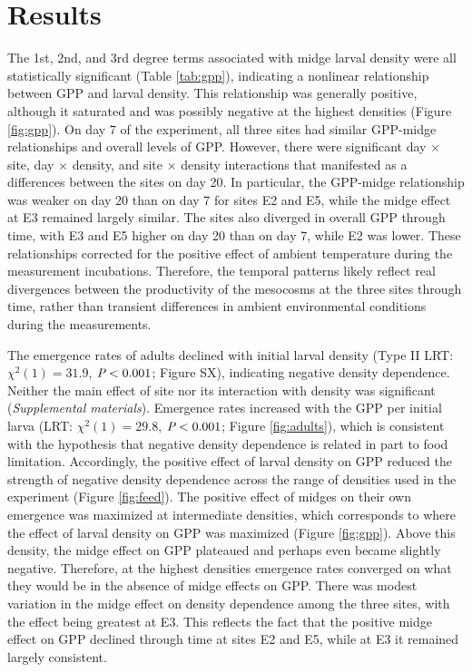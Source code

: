 

\section*{Results}
 
The 1st, 2nd, and 3rd degree terms associated with midge larval density
were all statistically significant (Table \ref{tab:gpp}), 
indicating a nonlinear relationship between GPP and larval density.
This relationship was generally positive, 
although it saturated 
and was possibly negative at the highest densities (Figure \ref{fig:gpp}).
On day 7 of the experiment, 
all three sites had similar GPP-midge relationships and overall levels of GPP.
However, there were significant day $\times$ site, day $\times$ density,
and site $\times$ density interactions that manifested as a differences
between the sites on day 20.
In particular, the GPP-midge relationship was weaker on day 20 than on day 7 for sites
E2 and E5, while the midge effect at E3 remained largely similar.
The sites also diverged in overall GPP through time,
with E3 and E5 higher on day 20 than on day 7,
while E2 was lower.
These relationships corrected for the positive effect of ambient temperature during the 
measurement incubations.
Therefore, the temporal patterns likely reflect real divergences 
between the productivity of the mesocosms at the three sites through time, 
rather than transient differences in ambient environmental conditions during the measurements.

The emergence rates of adults declined with initial larval density 
(Type II LRT: $\chi^2(1)=31.9$, $\emph{P} < 0.001$; Figure SX), 
indicating negative density dependence.
Neither the main effect of site nor its interaction with density was significant
(\emph{Supplemental materials}).
Emergence rates increased with the GPP per initial larva 
(LRT: $\chi^2(1)=29.8$, $\emph{P} < 0.001$; Figure \ref{fig:adults}),
which is consistent with the hypothesis that negative density dependence is 
related in part to food limitation.
Accordingly, the positive effect of larval density on GPP reduced the strength of 
negative density dependence across the range of densities 
used in the experiment (Figure \ref{fig:feed}).
The positive effect of midges on their own emergence was maximized at intermediate
densities, 
which corresponds to where the effect of larval density on GPP was maximized 
(Figure \ref{fig:gpp}).
Above this density, 
the midge effect on GPP plateaued and perhaps even became slightly negative. 
Therefore, at the highest densities emergence rates converged on what they would be 
in the absence of midge effects on GPP. 
There was modest variation in the midge effect on density dependence among the three sites,
with the effect being greatest at E3.
This reflects the fact that the positive midge effect on GPP declined through time
at sites E2 and E5, while at E3 it remained largely consistent. 

